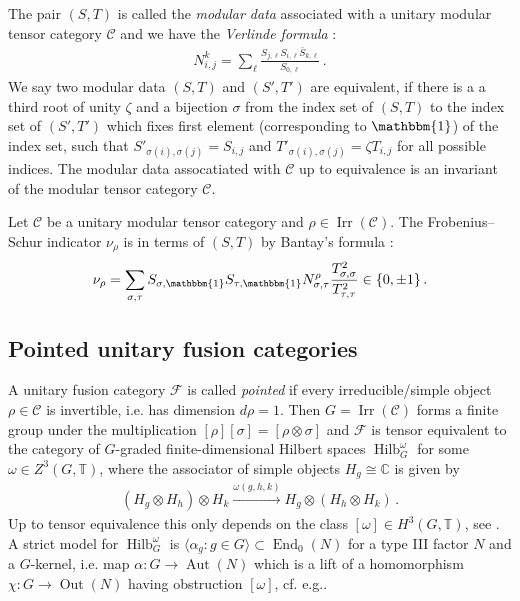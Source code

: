 \documentclass[twoside,11pt,reqno]{amsart}
\makeatletter
\theoremstyle{definition}
\theoremstyle{remark}
\newcommand{\cF}{\mathcal{F}}
\newcommand{\cC}{\mathcal{C}}
\newcommand{\TT}{\mathbb{T}}
\newcommand{\CC}{\mathbb{C}}
\DeclareMathOperator{\End}{End}
\DeclareMathOperator{\Aut}{Aut}
\DeclareRobustCommand{\eg}{e.g.\@\xspace}
\DeclareRobustCommand{\cf}{cf.\@\xspace}
\DeclareRobustCommand{\ie}{i.e.\@\xspace}
\DeclareMathOperator{\Out}{Out}
\DeclareMathOperator{\Vect}{Hilb}
\DeclareMathOperator{\Irr}{Irr}
\newcommand{\tu}{\mathbbm{1}} %
\newcommand{\myemph}[1]{\emph{#1}}
\makeatother
\begin{document}
The pair $(S,T)$ is called the \myemph{modular data} associated with
a unitary modular tensor category $\cC$
and we have the \myemph{Verlinde formula} \cite{Re1989}:
\begin{align} 
  \label{eq:Verlinde}
  N_{i,j}^k=\sum_\ell \frac{S_{j,\ell}S_{i,\ell}\bar S_{k,\ell}}{S_{0,\ell}}\,.
\end{align}
We say two modular data $(S,T)$ and $(S',T')$ are equivalent, if there is a
a third root of unity $\zeta$ and a 
bijection $\sigma$ from the index set of $(S,T)$ to the index set of $(S',T')$ 
which fixes first element (corresponding to $\tu$) of the index set, 
such that $S'_{\sigma (i),\sigma (j)} = S_{i,j}$ and 
$T'_{\sigma(i),\sigma(j)}=\zeta T_{i,j}$ for all possible indices. 
The modular data assocatiated with $\cC$ up to equivalence is an invariant of 
the modular tensor category $\cC$.

Let $\cC$ be a unitary modular tensor category and $\rho\in \Irr(\cC)$.
The Frobenius--Schur indicator $\nu_\rho$ is in terms of $(S,T)$ by
Bantay's formula \cite{Ba1997,GiRe2016}:
\begin{align}
  \label{eq:Bantay}
  \nu_\rho= \sum_{\sigma,\tau} S_{\sigma,\tu}S_{\tau,\tu} N_{\sigma,\tau}^\rho \frac{T_{\sigma,\sigma}^2}{T_{\tau,\tau}^2}\in\{0,\pm 1\}\,.
\end{align}

%
\subsection{Pointed unitary fusion categories}
%
\label{ssec:Pointed}
A unitary fusion category $\cF$ is called \myemph{pointed} if every 
irreducible/simple object $\rho\in\cC$ is invertible, 
\ie has dimension $d\rho=1$.
Then $G=\Irr(\cC)$ forms a finite group under the multiplication 
$[\rho][\sigma] = [\rho\otimes\sigma]$
and $\cF$ is tensor equivalent to the category of $G$-graded finite-dimensional
Hilbert spaces $\Vect_G^\omega$ for some $\omega\in Z^3(G,\TT)$,
where the associator of simple objects $H_g\cong \CC$ is given by 
\begin{align}
  (H_g\otimes H_h)\otimes H_k\xrightarrow{\omega(g,h,k) }
  H_g\otimes (H_h\otimes H_k)\,.
\end{align}
Up to tensor equivalence this only depends on the class 
$[\omega]\in H^3(G,\TT)$, 
see \cite{EtNiOs2010}.
A strict model for $\Vect_G^\omega$ is 
$\langle\alpha_g:g\in G\rangle\subset \End_0(N)$ for a type III
factor $N$ and a $G$-kernel, \ie map $\alpha \colon G\to \Aut(N)$ 
which is a lift of a homomorphism $\chi\colon G\to \Out(N)$ 
having obstruction $[\omega]$, \cf \eg \cite{Su1980,Jo1980,IzKo2002}.
\end{document}
